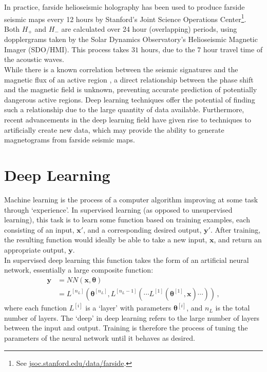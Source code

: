 \documentclass[11pt,a4paper,onecolumn]{report}
\begin{document}
In practice, farside helioseismic holography has been used to produce farside
seismic maps every 12 hours by Stanford's Joint Science Operations
Center\footnote{See \url{jsoc.stanford.edu/data/farside}.}. Both \(H_+\)
and \(H_-\) are calculated over 24 hour (overlapping) periods, using
dopplergrams taken by the Solar Dynamics Observatory's Helioseismic
Magnetic Imager (SDO/HMI). This process takes \(31 \) hours, due to the \(7\) hour
travel time of the acoustic waves. \\


While there is a known correlation between the seismic signatures and the
magnetic flux of an active region \citep{Gonzalez_Hernandez_2007}, a direct
relationship between the phase shift and the magnetic field is unknown,
preventing accurate prediction of potentially dangerous active regions. Deep
learning techniques offer the potential of finding such a relationship due to
the large quantity of data available. Furthermore, recent advancements in the
deep learning field have given rise to techniques to artificially create new
data, which may provide the ability to generate magnetograms from farside
seismic maps.


%
%
\section{Deep Learning}
%
%

\label{sec: deep learning}
Machine learning is the process of a computer algorithm improving at some task
through `experience'. In supervised learning (as opposed to unsupervised
learning), this task is to learn some function based on training examples,
each consisting of an input, \(\bm{x'}\), and a corresponding desired output,
\(\bm{y'}\). After training, the resulting function would ideally be able to
take a new input, \(\bm{x}\), and return an appropriate output, \(\bm{y}\). \\

In supervised deep learning this function takes the form of an artificial neural
network, essentially a large composite function:
\begin{align}
  \bm{y} &= NN(\bm{x}, \bm{\theta})\\
  &= L^{[n_L]}(\bm{\theta}^{[n_L]}, L^{[n_L-1]}( \dotsm L^{[1]}(\bm{\theta}^{[1]}, \bm{x}) \dotsm ))\,, 
\end{align}
where each function \(L^{[i]}\) is a `layer' with parameters
\(\bm{\theta}^{[i]}\), and \(n_L\) is the total number of layers. The `deep' in deep
learning refers to the large number of layers between the input and output.
Training is therefore the process of tuning the parameters of the neural
network until it behaves as desired. \\
\end{document}
